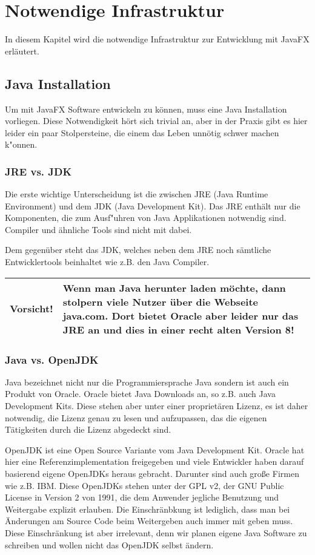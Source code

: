 \section{Notwendige Infrastruktur}
In diesem Kapitel wird die notwendige Infrastruktur zur Entwicklung mit JavaFX erläutert.
\subsection{Java Installation}
Um mit JavaFX Software entwickeln zu können, muss eine Java Installation vorliegen. Diese Notwendigkeit hört sich trivial an, aber in der Praxis gibt es hier leider ein paar Stolpersteine, die einem das Leben unnötig schwer machen k"onnen.

\subsubsection{JRE vs. JDK}
Die erste wichtige Unterscheidung ist die zwischen JRE (Java Runtime Environment) und dem JDK (Java Development Kit). Das JRE enthält nur die Komponenten, die zum Ausf"uhren von Java Applikationen notwendig sind. Compiler und ähnliche Tools sind nicht mit dabei.

Dem gegenüber steht das JDK, welches neben dem JRE noch sämtliche Entwicklertools beinhaltet wie z.B. den Java Compiler.

\begin{tabular}[h]{|p{2cm}|p{9cm}|}
\hline
\textbf{Vorsicht!} & Wenn man Java herunter laden möchte, dann stolpern viele Nutzer über die Webseite java.com. Dort bietet Oracle aber leider nur das JRE an und dies in einer recht alten Version 8! \\
\hline
\end{tabular}

\subsubsection{Java vs. OpenJDK}
Java bezeichnet nicht nur die Programmiersprache Java sondern ist auch ein Produkt von Oracle. Oracle bietet Java Downloads an, so z.B. auch Java Development Kits. Diese stehen aber unter einer proprietären Lizenz, es ist daher notwendig, die Lizenz genau zu lesen und aufzupassen, das die eigenen Tätigkeiten durch die Lizenz abgedeckt sind.

OpenJDK ist eine Open Source Variante vom Java Development Kit. Oracle hat hier eine Referenzimplementation freigegeben und viele Entwickler haben darauf basierend eigene OpenJDKs heraus gebracht. Darunter sind auch große Firmen wie z.B. IBM. Diese OpenJDKs stehen unter der GPL v2, der GNU Public License in Version 2 von 1991, die dem Anwender jegliche Benutzung und Weitergabe explizit erlauben. Die Einschränbkung ist lediglich, dass man bei Änderungen am Source Code beim Weitergeben auch immer mit geben muss. Diese Einschränkung ist aber irrelevant, denn wir planen eigene Java Software zu schreiben und wollen nicht das OpenJDK selbst ändern.

